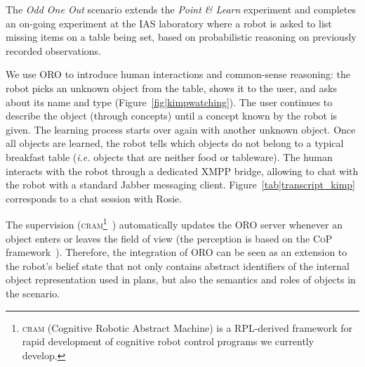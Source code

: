 The \emph{Odd One Out} scenario extends the \textit{Point \& Learn} experiment
and completes an on-going experiment at the IAS laboratory where a robot is
asked to list missing items on a table being set, based on probabilistic
reasoning on previously recorded observations.

We use ORO to introduce human interactions and common-sense reasoning: the
robot picks an unknown object from the table, shows it to the user, and asks
about its name and type (Figure~\ref{fig|kimpwatching}). The user continues to
describe the object (through concepts) until a concept known by the robot is
given. The learning process starts over again with another unknown object. Once
all objects are learned, the robot tells which objects do not belong to a
typical breakfast table (\textit{i.e.} objects that are neither food or
tableware). The human interacts with the robot through a dedicated XMPP bridge,
allowing to chat with the robot with a standard Jabber messaging client.
Figure~\ref{tab|transcript_kimp} corresponds to a chat session with Rosie.

The supervision (\textsc{cram}\footnote{\textsc{cram} (Cognitive Robotic
Abstract Machine) is a RPL-derived framework for rapid development of cognitive
robot control programs we currently develop.}~\cite{Beetz2010}) automatically
updates the ORO server whenever an object enters or leaves the field of view
(the perception is based on the \textsc{CoP} framework~\cite{Klank2009}).
Therefore, the integration of ORO can be seen as an extension to the robot's
belief state that not only contains abstract identifiers of the internal object
representation used in plans, but also the semantics and roles of objects in
the scenario.

